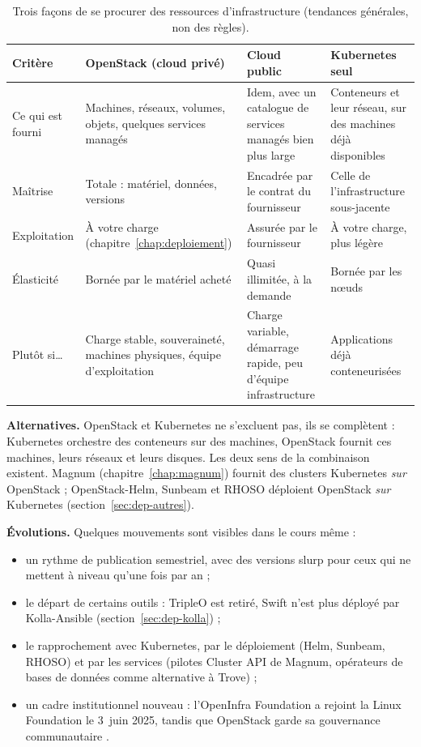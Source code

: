 \begin{table}[!ht]
\centering
\renewcommand{\arraystretch}{1.25}
\small
\begin{tabular}{@{}>{\raggedright\arraybackslash}p{2.4cm}>{\raggedright\arraybackslash}p{4.4cm}>{\raggedright\arraybackslash}p{4.4cm}>{\raggedright\arraybackslash}p{4.1cm}@{}}
\toprule
\textbf{Critère} & \textbf{OpenStack (cloud privé)} & \textbf{Cloud public} & \textbf{Kubernetes seul} \\
\midrule
Ce qui est fourni & Machines, réseaux, volumes, objets, quelques services managés & Idem, avec un catalogue de services managés bien plus large & Conteneurs et leur réseau, sur des machines déjà disponibles \\
Maîtrise & Totale : matériel, données, versions & Encadrée par le contrat du fournisseur & Celle de l'infrastructure sous-jacente \\
Exploitation & À votre charge (chapitre~\ref{chap:deploiement}) & Assurée par le fournisseur & À votre charge, plus légère \\
Élasticité & Bornée par le matériel acheté & Quasi illimitée, à la demande & Bornée par les nœuds \\
Plutôt si\dots & Charge stable, souveraineté, machines physiques, équipe d'exploitation & Charge variable, démarrage rapide, peu d'équipe infrastructure & Applications déjà conteneurisées \\
\bottomrule
\end{tabular}
\caption{Trois façons de se procurer des ressources d'infrastructure (tendances générales, non des règles).}
\label{tab:concl-alternatives}
\end{table}

\textbf{Alternatives.} OpenStack et Kubernetes ne s'excluent pas, ils se complètent : Kubernetes orchestre des conteneurs sur des
machines, OpenStack fournit ces machines, leurs réseaux et leurs disques. Les deux sens de la combinaison existent. Magnum
(chapitre~\ref{chap:magnum}) fournit des clusters Kubernetes \emph{sur} OpenStack ; OpenStack-Helm, Sunbeam et RHOSO déploient OpenStack
\emph{sur} Kubernetes (section~\ref{sec:dep-autres}).

\textbf{Évolutions.} Quelques mouvements sont visibles dans le cours même :
\begin{itemize}
  \item un rythme de publication semestriel, avec des versions \gls{slurp} pour ceux qui ne mettent à niveau qu'une fois par an
        \parencite{openstack-releases,openstack-slurp} ;
  \item le départ de certains outils : TripleO est retiré, Swift n'est plus déployé par Kolla-Ansible (section~\ref{sec:dep-kolla}) ;
  \item le rapprochement avec Kubernetes, par le déploiement (Helm, Sunbeam, RHOSO) et par les services (pilotes Cluster API de Magnum,
        opérateurs de bases de données comme alternative à Trove) ;
  \item un cadre institutionnel nouveau : l'OpenInfra Foundation a rejoint la Linux Foundation le 3~juin 2025, tandis que
        OpenStack garde sa gouvernance communautaire \parencite{openinfra-lf}.
\end{itemize}

